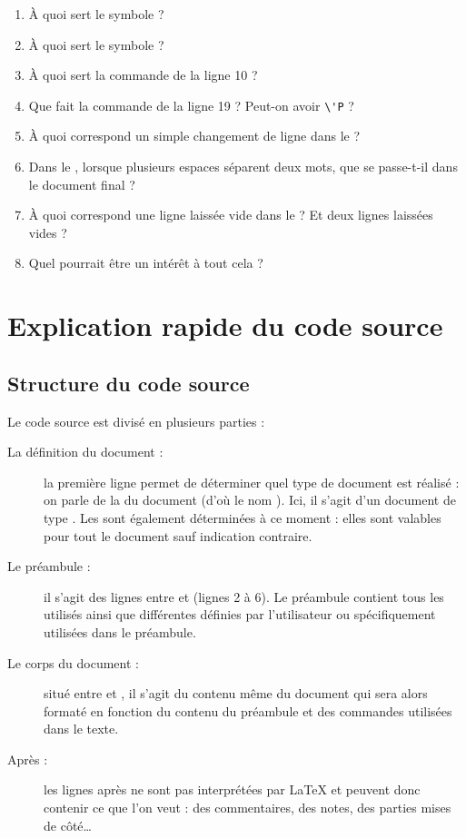 \begin{enumerate}
    \item À quoi sert le symbole \ordi{\$} ?
    \item À quoi sert le symbole \ordi{\%} ?
    \item À quoi sert la commande  de la ligne 10 ?
    \item Que fait la commande  de la ligne 19 ? Peut-on avoir \verb!\'P! ?
    \item À quoi correspond un simple changement de ligne dans le  ?
    \item Dans le , lorsque plusieurs espaces séparent deux mots, que se passe-t-il dans le document final ?
    \item À quoi correspond une ligne laissée vide dans le   ? Et deux lignes laissées vides ?
    \item Quel pourrait être un intérêt à tout cela ?
\end{enumerate}

\section{Explication rapide du code source}
\subsection{Structure du code source}

Le code source est divisé en plusieurs parties :
\begin{description}
    \item[La définition du document :] la première ligne permet de déterminer quel type de document est réalisé : on parle de la  du document (d'où le nom ). Ici, il s'agit d'un document de type . Les  sont également déterminées à ce moment : elles sont valables pour tout le document sauf indication contraire.
    \item[Le préambule :] il s'agit des lignes entre  et 
        (lignes 2 à 6). Le préambule contient tous les  utilisés ainsi que différentes  définies par l'utilisateur ou spécifiquement utilisées dans le préambule.
    \item[Le corps du document :] situé entre  et ,
        il s'agit du contenu même du document qui sera alors formaté en fonction du contenu du préambule et des commandes utilisées dans le texte.
    \item[Après :] les lignes après 
        ne sont pas interprétées par \LaTeX{} et peuvent donc contenir ce que l'on veut : des commentaires, des notes, des parties mises de côté\dots
\end{description}

